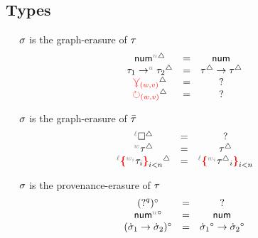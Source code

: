 \subsection{Types}

\judgbox{\graphErase{\TMV} = \STMV} ~~ $\sigma$ is the graph-erasure of $\tau$
%
\[
\begin{array}{ccc}
    \graphErase{\tnum} & = & \tNum{} \\
    \graphErase{\tarrow} & = & \TArrow{\graphErase{\TMV}}{\graphErase{\TMV}} \\
    \graphErase{\multiref} & = & \TUnknown \\
    \graphErase{\uniref} & = & \TUnknown \\
\end{array}
\]
    
    


\judgbox{\graphErase{\TLMV} = \STMV} ~~ $\sigma$ is the graph-erasure of $\bar{\tau}$
%
\[
\begin{array}{ccc}
    \graphErase{\ehole} & = & \TUnknown \\
    \graphErase{\lexp{\TMV}} & = & \graphErase{\TMV} \\
    \graphErase{\conflict{\TMV}} & = & \conflict{\graphErase{\TMV}} \\  
\end{array}
\]


\judgbox{\provErase{\PTMV} = \STMV} ~~ $\sigma$ is the provenance-erasure of $\tau$
%
\[
\begin{array}{ccc}
    \provErase{(\TUnknown^{\Provp})} & = & \TUnknown \\
    \provErase{\tnum} & = & \tNum{} \\
    \provErase{(\TArrow{\PTMV_1}{\PTMV_2})} & = & \TArrow{\provErase{\PTMV_1}}{\provErase{\PTMV_2}}
\end{array}
\]

    
